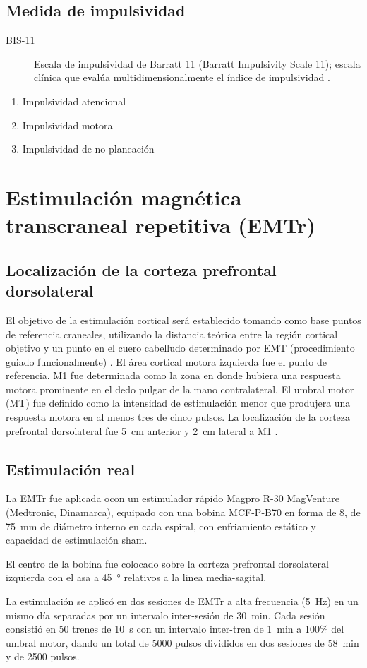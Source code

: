 \subsection{Medida de impulsividad}
\begin{description}
    \item[BIS-11] Escala de impulsividad de Barratt 11 (Barratt Impulsivity Scale 11); escala clínica que evalúa multidimensionalmente el índice de impulsividad \parencite{H.Patton1995,Salvo2013}.
\end{description}
\begin{enumerate}[label=Subescala \arabic*., left=3\parindent]
    \item Impulsividad atencional
    \item Impulsividad motora
    \item Impulsividad de no-planeación
\end{enumerate}

\section{Estimulación magnética transcraneal repetitiva (EMTr)}
\subsection{Localización de la corteza prefrontal dorsolateral}
El objetivo de la estimulación cortical será establecido tomando como base puntos de referencia craneales, utilizando la distancia teórica entre la región cortical objetivo y un punto en el cuero cabelludo determinado por EMT (procedimiento guiado funcionalmente) \parencite{Sparing2008}.
El área cortical motora izquierda fue el punto de referencia.
M1 fue determinada como la zona en donde hubiera una respuesta motora prominente en el dedo pulgar de la mano contralateral.
El umbral motor (MT) fue definido como la intensidad de estimulación menor que produjera una respuesta motora en al menos tres de cinco pulsos.
La localización de la corteza prefrontal dorsolateral fue \SI{5}{\centi\meter} anterior y \SI{2}{\centi\meter} lateral a M1 \parencite{Herwig2001a,Varnava2011a}.

\subsection{Estimulación real}
La EMTr fue aplicada ocon un estimulador rápido Magpro R-30 MagVenture (Medtronic, Dinamarca), equipado con una bobina MCF-P-B70 en forma de 8, de \SI{75}{\milli\meter} de diámetro interno en cada espiral, con enfriamiento estático y capacidad de estimulación sham. \par
El centro de la bobina fue colocado sobre la corteza prefrontal dorsolateral izquierda con el asa a \SI{45}{\degree} relativos a la linea media-sagital. \par
La estimulación se aplicó en dos sesiones de EMTr a alta frecuencia (\SI{5}{\hertz}) en un mismo día separadas por un intervalo inter-sesión de \SI{30}{\minute}.
Cada sesión consistió en 50 trenes de \SI{10}{\second} con un intervalo inter-tren de \SI{1}{\minute} a 100\% del umbral motor, dando un total de 5000 pulsos divididos en dos sesiones de \SI{58}{\minute} y de 2500 pulsos.

